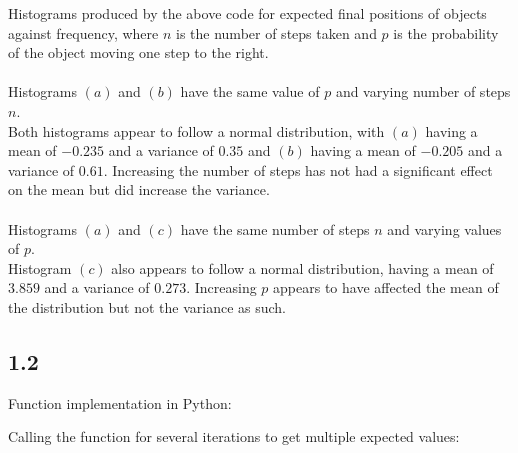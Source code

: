 \documentclass[answers]{exam}
\begin{document}
Histograms produced by the above code for expected final positions of objects against frequency, where $n$ is the number of steps taken and $p$ is the probability of the object moving one step to the right.\\
\\
Histograms $(a)$ and $(b)$ have the same value of $p$ and varying number of steps $n$. \\
Both histograms appear to follow a normal distribution, with $(a)$ having a mean of $-0.235$ and a variance of $0.35$ and $(b)$ having a mean of $-0.205$ and a variance of $0.61$. Increasing the number of steps has not had a significant effect on the mean but did increase the variance.\\ \\
Histograms $(a)$ and $(c)$ have the same number of steps $n$ and varying values of $p$. \\
Histogram $(c)$ also appears to follow a normal distribution, having a mean of $3.859$ and a variance of $0.273$. Increasing $p$ appears to have affected the mean of the distribution but not the variance as such.\\


\pagebreak
\subsection*{1.2}
Function implementation in Python:

Calling the function for several iterations to get multiple expected values:

\pagebreak
\end{document}
